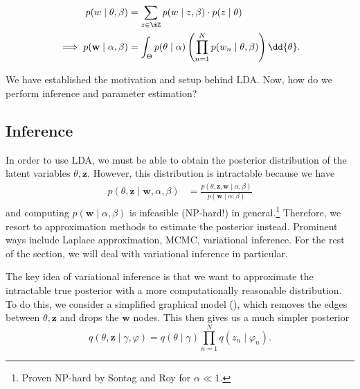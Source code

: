 \begin{align*}
    p(w\mid \theta, \beta) &= \sum\limits_{z\in \mZ}^{} p(w\mid z, \beta) \cdot p(z\mid  \theta)\\
    \implies p(\mathbf{w}\mid \alpha, \beta) &= \int_{\Theta} p(\theta \mid\alpha) \left( \prod\limits_{n=1}^{N} p(w_n\mid \theta, \beta) \right) \dd{\theta}.
\end{align*}
\begin{ques}
    We have established the motivation and setup behind LDA. Now, how do we perform inference and parameter estimation?
\end{ques}

\subsection{Inference}
In order to use LDA, we must be able to obtain the posterior distribution of the latent variables $\theta, \mathbf{z}$. However, this distribution is intractable because we have
\begin{align*}
    p(\theta, \mathbf{z} \mid \mathbf{w}, \alpha, \beta) &=  \frac{p(\theta, \mathbf{z}, \mathbf{w} \mid \alpha, \beta)}{p(\mathbf{w} \mid \alpha, \beta)}
\end{align*}
and computing $p(\mathbf{w}\mid \alpha, \beta)$ is infeasible (NP-hard!) in general.\footnote{Proven NP-hard by Sontag and Roy for $\alpha\ll 1$.} Therefore, we resort to approximation methods to estimate the posterior instead. Prominent ways include Laplace approximation, MCMC, variational inference. For the rest of the section, we will deal with variational inference in particular.

The key idea of variational inference is that we want to approximate the intractable true posterior with a more computationally reasonable distribution. To do this, we consider a simplified graphical model (), which removes the edges between $\theta, \mathbf{z}$ and drops the $\mathbf{w}$ nodes. This then gives us a much simpler posterior
\[
q(\theta, \mathbf{z} \mid \gamma, \varphi) = q(\theta \mid \gamma) \prod\limits_{n=1}^{N} q(z_n \mid \varphi_n).
\]

